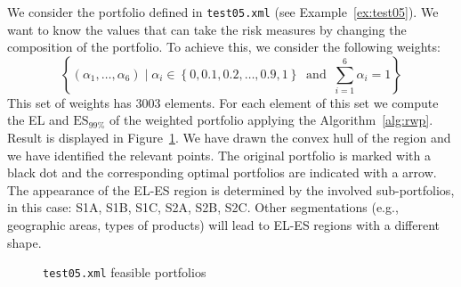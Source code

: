 \documentclass[11pt,fleqn]{book} %
\begin{document}
\begin{example}
	We consider the portfolio defined in \texttt{test05.xml} (see Example~\ref{ex:test05}).
	We want to know the values that can take the risk measures by changing the 
	composition of the portfolio. To achieve this, we consider the following 
	weights:
	\begin{displaymath}
		\left\{
		\left( \alpha_1,\dots,\alpha_6 \right) \mid
		\alpha_i \in \left\{0, 0.1, 0.2,\dots,0.9,1 \right\}
		\ \text{ and }\ \displaystyle \sum_{i=1}^6 \alpha_i = 1
		\right\}
	\end{displaymath}
	This set of weights has \num{3003} elements. For each element of this set we
	compute the EL and $\text{ES}_{99\%}$ of the weighted portfolio applying the
	Algorithm~\ref{alg:rwp}. Result is displayed in Figure~\ref{fig:optim1}. We
	have drawn the convex hull of the region and we have identified the relevant 
	points. The original portfolio is marked with a black dot and the 
	corresponding optimal portfolios are indicated with a arrow. The appearance 
	of the EL-ES region is determined by the involved sub-portfolios, in this 
	case: S1A, S1B, S1C, S2A, S2B, S2C. Other segmentations (e.g., geographic 
	areas, types of products) will lead to EL-ES regions with a different shape. 
\end{example}

\begin{figure}[!ht]
	\centering
	\caption{\texttt{test05.xml} feasible portfolios}
	\label{fig:optim1}
\end{figure}
\end{document}
